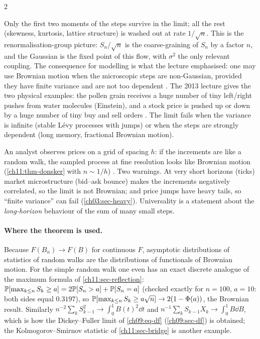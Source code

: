 \begin{paracol}{2}
\begin{intuition}
Only the first two moments of the steps survive in the limit; all the rest (skewness, kurtosis, lattice structure) is
washed out at rate $1/\sqrt n$. This is the renormalisation-group picture: $S_n/\sqrt n$ is the coarse-graining of
$S_n$ by a factor $n$, and the Gaussian is the fixed point of this flow, with $\sigma^2$ the only relevant coupling. The
consequence for modelling is what the lecture emphasised: one may use Brownian motion when the microscopic steps are
non-Gaussian, provided they have finite variance and are not too dependent . The 2013
lecture gives the two physical examples: the pollen grain receives a huge number of tiny left/right pushes from
water molecules (Einstein), and a stock price is pushed up or down by a huge number of tiny buy and sell orders
. The limit fails when the variance is infinite (stable L\'evy
processes with jumps) or when the steps are strongly dependent (long memory, fractional Brownian motion).
\end{intuition}

\begin{finance}
An analyst observes prices on a grid of spacing $h$: if the increments are like a random walk, the sampled process at fine
resolution looks like Brownian motion (\cref{ch11:thm-donsker} with $n\sim1/h$) . Two warnings. At very short horizons
(ticks) market microstructure (bid--ask bounce) makes the increments negatively correlated, so the limit is not
Brownian; and price jumps have heavy tails, so ``finite variance'' can fail (\cref{ch03:sec-heavy}). Universality is a
statement about the \emph{long-horizon} behaviour of the sum of many small steps.
\end{finance}

\paragraph{Where the theorem is used.} Because $F(B_n)\to F(B)$ for continuous $F$, asymptotic distributions of statistics
of random walks are the distributions of functionals of Brownian motion. For the simple random walk one even has an exact
discrete analogue of the maximum formula of \cref{ch11:sec-reflection}: $\mathbb{P}[\max_{k\le n}S_k\ge a]=2\mathbb{P}[S_n>a]+\mathbb{P}[S_n=a]$
(checked exactly for $n=100$, $a=10$: both sides equal $0.3197$), so $\mathbb{P}[\max_{k\le n}S_k\ge a\sqrt n]\to2(1-\Phi(a))$, the
Brownian result. Similarly $n^{-2}\sum_kS_{k-1}^2\to\int_0^1B(t)^2\dd t$ and $n^{-1}\sum_kS_{k-1}X_k\to\int_0^1B\dd B$,
which is how the Dickey--Fuller limit of \cref{ch09:eq-df} (\cref{ch09:sec-df}) is obtained; the Kolmogorov--Smirnov statistic
of \cref{ch11:sec-bridge} is another example.


\end{paracol}
